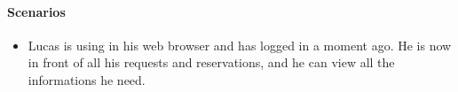 \paragraph{Scenarios}
\begin{itemize}
	\item Lucas is using \myTaxiService{} in his web browser and has logged in a moment ago.
	He is now in front of all his requests and reservations, and he can view all the informations he need.
\end{itemize}
